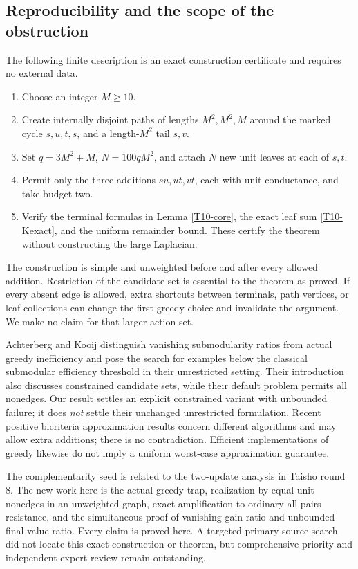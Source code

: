 \documentclass[11pt,a4paper]{article}
\theoremstyle{definition}\newtheorem{definition}[theorem]{Definition}
\theoremstyle{remark}\newtheorem{remark}[theorem]{Remark}
\numberwithin{equation}{section}
\begin{document}
\subsection{Reproducibility and the scope of the obstruction}\label{T10-sec-6}
The following finite description is an exact construction certificate and requires no external data.
\begin{enumerate}
\item Choose an integer $M\ge10$.
\item Create internally disjoint paths of lengths $M^2,M^2,M$ around the marked cycle $s,u,t,s$, and a length-$M^2$ tail $s,v$.
\item Set $q=3M^2+M$, $N=100qM^2$, and attach $N$ new unit leaves at each of $s,t$.
\item Permit only the three additions $su,ut,vt$, each with unit conductance, and take budget two.
\item Verify the terminal formulas in Lemma \ref{T10-core}, the exact leaf sum \eqref{T10-Kexact}, and the uniform remainder bound. These certify the theorem without constructing the large Laplacian.
\end{enumerate}
The construction is simple and unweighted before and after every allowed addition. Restriction of the candidate set is essential to the theorem as proved. If every absent edge is allowed, extra shortcuts between terminals, path vertices, or leaf collections can change the first greedy choice and invalidate the argument. We make no claim for that larger action set.

Achterberg and Kooij \cite{ref052} distinguish vanishing submodularity ratios from actual greedy inefficiency and pose the search for examples below the classical submodular efficiency threshold in their unrestricted setting. Their introduction also discusses constrained candidate sets, while their default problem permits all nonedges. Our result settles an explicit constrained variant with unbounded failure; it does \emph{not} settle their unchanged unrestricted formulation. Recent positive bicriteria approximation results \cite{ref057} concern different algorithms and may allow extra additions; there is no contradiction. Efficient implementations of greedy \cite{ref058} likewise do not imply a uniform worst-case approximation guarantee.

The complementarity seed is related to the two-update analysis in Taisho round 8. The new work here is the actual greedy trap, realization by equal unit nonedges in an unweighted graph, exact amplification to ordinary all-pairs resistance, and the simultaneous proof of vanishing gain ratio and unbounded final-value ratio. Every claim is proved here. A targeted primary-source search did not locate this exact construction or theorem, but comprehensive priority and independent expert review remain outstanding.
\end{document}
